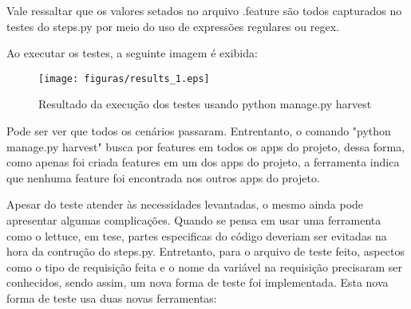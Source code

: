     Vale ressaltar que os valores setados no arquivo .feature são todos
    capturados no testes do steps.py por meio do uso de expressões regulares ou
    regex.

    Ao executar os testes, a seguinte imagem é exibida:

    \begin{figure}[h!]
        \centering
        \texttt{[image: figuras/results\_1.eps]}
        \caption{Resultado da execução dos testes usando python manage.py 
        harvest}
    \end{figure}

    Pode ser ver que todos os cenários passaram. Entrentanto, o comando "python
    manage.py harvest" busca por features em todos os apps do projeto, dessa
    forma, como apenas foi criada features em um dos apps do projeto, a
    ferramenta indica que nenhuma feature foi encontrada nos outros apps do
    projeto.

    Apesar do teste atender às necessidades levantadas, o mesmo ainda pode
    apresentar algumas complicações. Quando se pensa em usar uma ferramenta como
    o lettuce, em tese, partes especificas do código deveriam ser evitadas na
    hora da contrução do steps.py. Entretanto, para o arquivo de teste feito,
    aspectos como o tipo de requisição feita e o nome da variável na requisição
    precisaram ser conhecidos, sendo assim, um nova forma de teste foi
    implementada. Esta nova forma de teste usa duas novas ferramentas:

